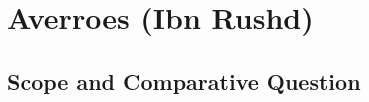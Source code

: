 %
%
%
%
%
%
%
%
%


\section{Averroes (Ibn Rushd)}
\label{sec:ch08_s15}



\subsection{Scope and Comparative Question}
\label{subsec:ch08_s15_ss01}

